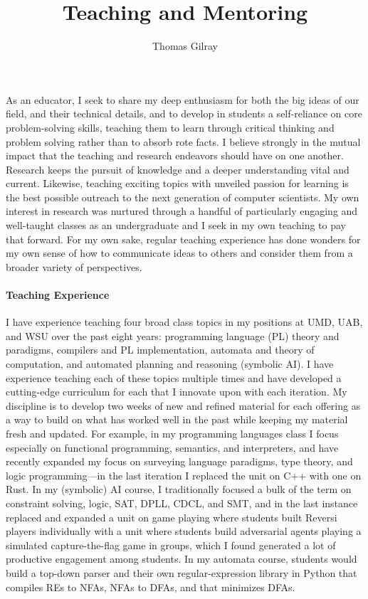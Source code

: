 \documentclass[12pt]{article}
\begin{document}
\title{Teaching and Mentoring}
\author{\vspace{-1.5cm}Thomas Gilray}
\date{}
\maketitle
\vspace{-0.5cm}

As an educator, I seek to share my deep enthusiasm for both the big ideas of our field, and their technical details, and to develop in students a self-reliance on core problem-solving skills, teaching them to learn through critical thinking and problem solving rather than to absorb rote facts.
I believe strongly in the mutual impact that the teaching and research endeavors should have on one another.
Research keeps the pursuit of knowledge and a deeper understanding vital and current.
Likewise, teaching exciting topics with unveiled passion for learning is the best possible outreach to the next generation of computer scientists. My own interest in research was nurtured through a handful of particularly engaging and well-taught classes
as an undergraduate and I seek in my own teaching to pay that forward. For my own sake, regular teaching experience has done wonders for my own
sense of how to communicate ideas to others and consider them from a broader variety of perspectives. 

\paragraph{Teaching Experience}
%
I have experience teaching four broad class topics in my positions at UMD, UAB, and WSU over the past eight years: programming language (PL) theory and paradigms, compilers and PL implementation, automata and theory of computation, and automated planning and reasoning (symbolic AI). I have experience teaching each of these topics multiple times and have developed a cutting-edge curriculum for each that I innovate upon with each iteration. My discipline is to develop two weeks of new and refined material for each offering as a way to build on what has worked well in the past while keeping my material fresh and updated. For example, in my programming languages class I focus especially on functional programming, semantics, and interpreters, and have recently expanded my focus on surveying language paradigms, type theory, and logic programming---in the last iteration I replaced the unit on C++ with one on Rust. In my (symbolic) AI course, I traditionally focused a bulk of the term on constraint solving, logic, SAT, DPLL, CDCL, and SMT, and in the last instance replaced and expanded a unit on game playing where students built Reversi players individually with a unit where students build adversarial agents playing a simulated capture-the-flag game in groups, which I found generated a lot of productive engagement among students. In my automata course, students would build a top-down parser and their own regular-expression library in Python that compiles REs to NFAs, NFAs to DFAs, and that minimizes DFAs.
\end{document}
